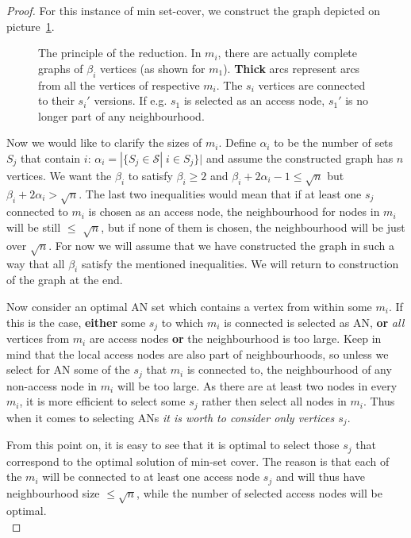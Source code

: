 \begin{proof}
			\noindent For this instance of min set-cover, we construct the graph depicted on picture~\ref{fig:reduction}.
			 
			\begin{figure}[h!]
				\begin{center}
				\end{center}
				\caption{\label{fig:reduction} The principle of the reduction. In $m_{i}$, there are actually complete graphs of $\beta_{i}$ vertices (as shown for $m_{1}$). \textbf{Thick} arcs represent arcs from all the vertices of respective $m_{i}$. The $s_{i}$ vertices are connected to their $s_{i}'$ versions. If e.g. $s_{1}$ is selected as an access node, $s_{1}'$ is no longer part of any neighbourhood.}
			\end{figure}
			
			\noindent Now we would like to clarify the sizes of $m_{i}$. Define $\alpha_{i}$ to be the number of sets $S_{j}$ that contain $i$: $\alpha_{i} = |\{S_{j} \in \mathcal{S}| \; i \in S_{j}\}|$ and assume the constructed graph has $n$ vertices. We want the $\beta_{i}$ to satisfy $\beta_{i} \geq 2$ and $\beta_{i} + 2\alpha_{i} - 1 \leq \sqrt{n}$ but $\beta_{i} + 2\alpha_{i} > \sqrt{n}$. The last two inequalities would mean that if at least one $s_{j}$ connected to $m_{i}$ is chosen as an access node, the neighbourhood for nodes in $m_{i}$ will be still $\leq$ $\sqrt{n}$, but if none of them is chosen, the neighbourhood will be just over $\sqrt{n}$. For now we will assume that we have constructed the graph in such a way that all $\beta_{i}$ satisfy the mentioned inequalities. We will return to construction of the graph at the end.
			
			Now consider an optimal AN set which contains a vertex from within some $m_{i}$. If this is the case, \textbf{either} some $s_{j}$ to which $m_{i}$ is connected is selected as AN, \textbf{or} \textit{all} vertices from $m_{i}$ are access nodes \textbf{or} the neighbourhood is too large. Keep in mind that the local access nodes are also part of neighbourhoods, so unless we select for AN some of the $s_{j}$ that $m_{i}$ is connected to, the neighbourhood of any non-access node in $m_{i}$ will be too large. As there are at least two nodes in every $m_{i}$, it is more efficient to select some $s_{j}$ rather then select all nodes in $m_{i}$. Thus when it comes to selecting ANs \textit{it is worth to consider only vertices $s_{j}$}.
			
			From this point on, it is easy to see that it is optimal to select those $s_{j}$ that correspond to the optimal solution of min-set cover. The reason is that each of the $m_{i}$ will be connected to at least one access node $s_{j}$ and will thus have neighbourhood size $\leq \sqrt{n}$, while the number of selected access nodes will be optimal. \\
			

\end{proof}
